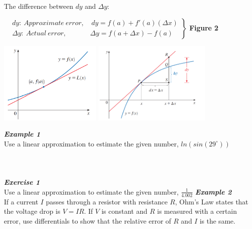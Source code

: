 \documentclass[12px]{article}
\begin{document}
\begin{enumerate}
    The difference between $dy$ and $\Delta y$:
    \begin{center}
        $
        \left.
        \begin{aligned}
            &dy:\ Approximate\ error,\quad dy = f(a)+f'(a)(\Delta x) \nonumber \\
            &\Delta y:\ Actual\ error,\ \,\quad\qquad \Delta y=f(a+\Delta x)-f(a) \nonumber
        \end{aligned}
        \right\} 
        $ \textbf{Figure 2}
    \end{center}
    \begin{multicols}{2}
        \includegraphics*[height=4cm]{Linearization.png}
        \includegraphics*[height=4cm]{Lin_Approx.png}
    \end{multicols}
    \textbf{\textit{Example 1}}\\
    Use a linear approximation to estimate the given number, $ln(sin(29^{\circ}))$\\
    \\
    \\
    \\
    \textbf{\textit{Exercise 1}}\\
    Use a linear approximation to estimate the given number, $\frac{1}{4.002}$
    \newpage
    \textbf{\textit{Example 2}}\\
    If a current $I$ passes through a resistor with resistance $R$, Ohm's Law states that the voltage drop is $V=IR$. If $V$ is constant and $R$ is measured with a certain error, use differentials to show that the relative error of $R$ and $I$ is the same.\\
    \\

\end{enumerate}
\end{document}
